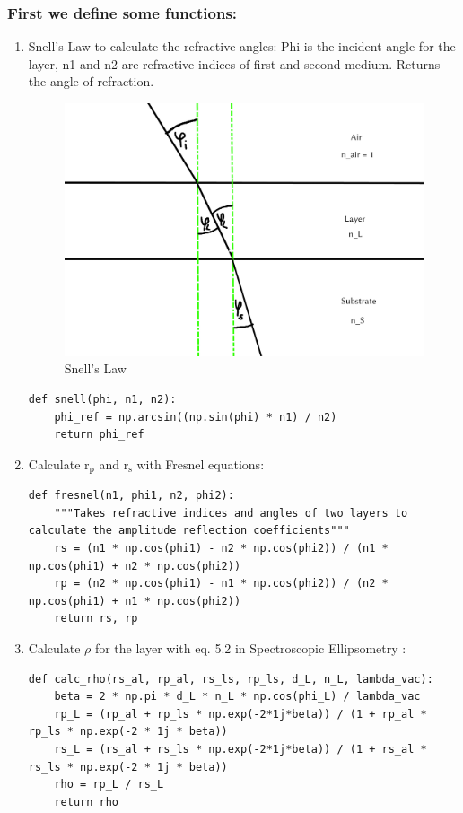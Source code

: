 \documentclass[11pt]{article}
\begin{document}
\subsubsection{First we define some functions:}
\label{sec:org82e60c1}
\begin{enumerate}
\item Snell's Law to calculate the refractive angles:
\label{sec:org82db8b0}
Phi is the incident angle for the layer, n1 and n2 are refractive indices of first and second medium. Returns the angle of refraction.

\begin{figure}[H]
\centering
\includegraphics[width=\textwidth]{./snell.jpg}
\caption{\label{fig:org79a5148}
Snell's Law}
\end{figure}
\begin{verbatim}
def snell(phi, n1, n2):
    phi_ref = np.arcsin((np.sin(phi) * n1) / n2)
    return phi_ref
\end{verbatim}


\item Calculate r\(_{\text{p}}\) and r\(_{\text{s}}\) with Fresnel equations:
\label{sec:orgdd5ff0c}
\begin{verbatim}
def fresnel(n1, phi1, n2, phi2):
    """Takes refractive indices and angles of two layers to calculate the amplitude reflection coefficients"""
    rs = (n1 * np.cos(phi1) - n2 * np.cos(phi2)) / (n1 * np.cos(phi1) + n2 * np.cos(phi2))
    rp = (n2 * np.cos(phi1) - n1 * np.cos(phi2)) / (n2 * np.cos(phi1) + n1 * np.cos(phi2))
    return rs, rp
\end{verbatim}


\item Calculate \(\rho\) for the layer with eq. 5.2 in Spectroscopic Ellipsometry :
\label{sec:org8983924}
\begin{verbatim}
def calc_rho(rs_al, rp_al, rs_ls, rp_ls, d_L, n_L, lambda_vac):
    beta = 2 * np.pi * d_L * n_L * np.cos(phi_L) / lambda_vac
    rp_L = (rp_al + rp_ls * np.exp(-2*1j*beta)) / (1 + rp_al * rp_ls * np.exp(-2 * 1j * beta))
    rs_L = (rs_al + rs_ls * np.exp(-2*1j*beta)) / (1 + rs_al * rs_ls * np.exp(-2 * 1j * beta))
    rho = rp_L / rs_L
    return rho
\end{verbatim}
\end{enumerate}
\end{document}
